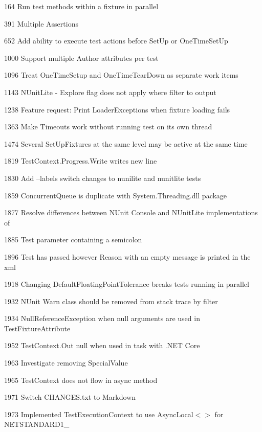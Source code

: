 \begin{DoxyItemize}
\item 164 Run test methods within a fixture in parallel
\item 391 Multiple Assertions
\item 652 Add ability to execute test actions before Set\+Up or One\+Time\+Set\+Up
\item 1000 Support multiple Author attributes per test
\item 1096 Treat One\+Time\+Setup and One\+Time\+Tear\+Down as separate work items
\item 1143 N\+Unit\+Lite -\/ Explore flag does not apply where filter to output
\item 1238 Feature request\+: Print Loader\+Exceptions when fixture loading fails
\item 1363 Make Timeouts work without running test on its own thread
\item 1474 Several Set\+Up\+Fixtures at the same level may be active at the same time
\item 1819 Test\+Context.\+Progress.\+Write writes new line
\item 1830 Add --labels switch changes to nunilite and nunitlite tests
\item 1859 Concurrent\+Queue is duplicate with System.\+Threading.\+dll package
\item 1877 Resolve differences between N\+Unit Console and N\+Unit\+Lite implementations of 
\item 1885 Test parameter containing a semicolon
\item 1896 Test has passed however Reason with an empty message is printed in the xml
\item 1918 Changing Default\+Floating\+Point\+Tolerance breaks tests running in parallel
\item 1932 N\+Unit Warn class should be removed from stack trace by filter
\item 1934 Null\+Reference\+Exception when null arguments are used in Test\+Fixture\+Attribute
\item 1952 Test\+Context.\+Out null when used in task with .N\+ET Core
\item 1963 Investigate removing Special\+Value
\item 1965 Test\+Context does not flow in async method
\item 1971 Switch C\+H\+A\+N\+G\+E\+S.\+txt to Markdown
\item 1973 Implemented Test\+Execution\+Context to use Async\+Local$<$$>$ for N\+E\+T\+S\+T\+A\+N\+D\+A\+R\+D1\+\_
$$
\end{DoxyItemize}
